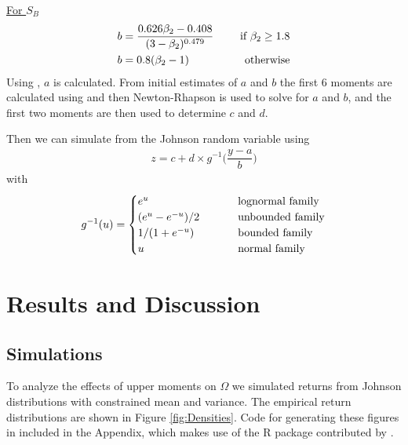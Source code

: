 \documentclass[paper=a4, fontsize=11pt]{scrartcl}
\begin{document}
\underline{For $S_B$}
\vspace*{3mm}
\begin{align}
b &= \dfrac{0.626\beta_2 - 0.408}{(3 - \beta_2)^{0.479}} \hspace*{5mm} &\text{if } \beta_2 \geq 1.8 \nonumber \\
b &= 0.8(\beta_2 - 1) &\text{otherwise} \nonumber
\end{align}
Using \cite{draper1951}, $a$ is calculated. From initial estimates of $a$ and $b$ the first 6 moments are calculated using \cite{draper1952}
and then Newton-Rhapson is used to solve for $a$ and $b$, and the first two moments are then used to determine $c$ and $d$.

Then we can simulate from the Johnson random variable using
\begin{align}
z = c + d \times g^{-1}\Big(\dfrac{y - a}{b}\Big)
\end{align}
with
\begin{align}
g^{-1}(u) = 
\begin{cases}
e^u \hspace{25mm} &\text{lognormal family}\\
(e^u - e^{-u})/2 &\text{unbounded family}\\
1/(1 + e^{-u}) &\text{bounded family}\\
u &\text{normal family}
\end{cases}
\end{align}
\newpage
\section{Results and Discussion}
\subsection{Simulations}
To analyze the effects of upper moments on $\Omega$ we simulated returns from Johnson distributions with constrained mean and variance.
The empirical return distributions are shown in Figure \ref{fig:Densities}. Code for generating these figures in included in the Appendix,
which makes use of the R package contributed by \cite{mcleod2012}.
\end{document}
